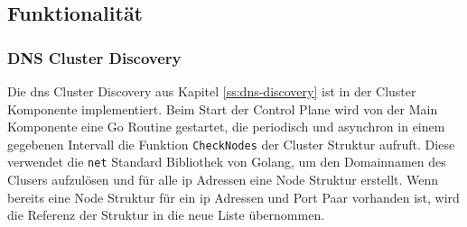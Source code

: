 \newpage
\subsection{Funktionalität}
\subsubsection{DNS Cluster Discovery}
Die \ac{dns} Cluster Discovery aus Kapitel \ref{ss:dns-discovery} ist in der Cluster Komponente implementiert.
Beim Start der Control Plane wird von der Main Komponente eine Go Routine gestartet, die periodisch und asynchron in einem gegebenen Intervall die Funktion \verb|CheckNodes| der Cluster Struktur aufruft. Diese verwendet die \verb|net| Standard Bibliothek von Golang, um den Domainnamen des Clusers aufzulösen und für alle \ac{ip} Adressen eine Node Struktur erstellt. Wenn bereits eine Node Struktur für ein \ac{ip} Adressen und Port Paar vorhanden ist, wird die Referenz der Struktur in die neue Liste übernommen.

